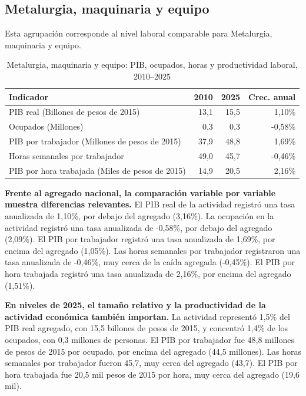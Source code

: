 \subsection{Metalurgia, maquinaria y equipo}

Esta agrupación corresponde al nivel laboral comparable para Metalurgia, maquinaria y equipo.

\begin{table}[H]
\centering
\caption{Metalurgia, maquinaria y equipo: PIB, ocupados, horas y productividad laboral, 2010--2025}
\label{tab:agg25_c05_productividad}
\small
\begin{tabular}{lrrr}
\toprule
Indicador & 2010 & 2025 & Crec. anual \\
\midrule
PIB real  (Billones de pesos de 2015) & 13,1 & 15,5 & 1,10\% \\
Ocupados (Millones) & 0,3 & 0,3 & -0,58\% \\
PIB por trabajador (Millones de pesos de 2015) & 37,9 & 48,8 & 1,69\% \\
Horas semanales por trabajador & 49,0 & 45,7 & -0,46\% \\
PIB por hora trabajada (Miles de pesos de 2015) & 14,9 & 20,5 & 2,16\% \\
\bottomrule
\end{tabular}
\end{table}

\textbf{Frente al agregado nacional, la comparación variable por variable muestra diferencias relevantes.} El PIB real de la actividad registró una tasa anualizada de 1,10\%, por debajo del agregado (3,16\%). La ocupación en la actividad registró una tasa anualizada de -0,58\%, por debajo del agregado (2,09\%). El PIB por trabajador registró una tasa anualizada de 1,69\%, por encima del agregado (1,05\%). Las horas semanales por trabajador registraron una tasa anualizada de -0,46\%, muy cerca de la caída agregada (-0,45\%). El PIB por hora trabajada registró una tasa anualizada de 2,16\%, por encima del agregado (1,51\%).

\textbf{En niveles de 2025, el tamaño relativo y la productividad de la actividad económica también importan.} La actividad representó 1,5\% del PIB real agregado, con 15,5 billones de pesos de 2015, y concentró 1,4\% de los ocupados, con 0,3 millones de personas. El PIB por trabajador fue 48,8 millones de pesos de 2015 por ocupado, por encima del agregado (44,5 millones). Las horas semanales por trabajador fueron 45,7, muy cerca del agregado (43,7). El PIB por hora trabajada fue 20,5 mil pesos de 2015 por hora, muy cerca del agregado (19,6 mil).

